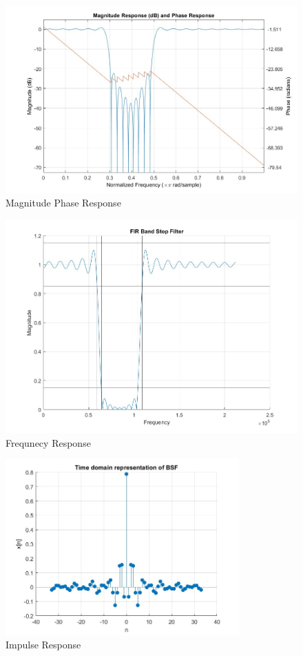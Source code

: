 \documentclass{scrartcl}
\begin{document}
\begin{figure}[ht!]
    \centering
    \includegraphics[width = \textwidth]{Graphics/Bandstop.jpg}
    \caption{Magnitude Phase Response}
\end{figure}

\begin{figure}[ht!]
    \centering
    \includegraphics[width = \textwidth]{Graphics/Freq.jpg}
    \caption{Frequnecy Response}
\end{figure}

\begin{figure}[ht!]
    \centering
    \includegraphics[width = 0.8\textwidth]{Graphics/Impulsestop.jpg}
    \caption{Impulse Response}
\end{figure}
\end{document}
